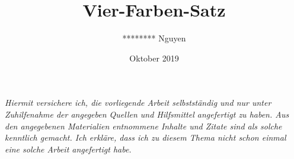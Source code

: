\documentclass{article}
\title{Vier-Farben-Satz}
\author{******** Nguyen}
\date{Oktober 2019}
\begin{document}
\maketitle
\newpage
\tableofcontents
\newpage
\textit{Hiermit versichere ich, die vorliegende Arbeit selbstständig und nur unter Zuhilfenahme der angegeben Quellen und Hilfsmittel angefertigt zu haben. Aus den angegebenen Materialien entnommene Inhalte und Zitate sind als solche kenntlich gemacht. Ich erkläre, dass ich zu diesem Thema nicht schon einmal eine solche Arbeit angefertigt habe.}







\printbibliography
\end{document}
